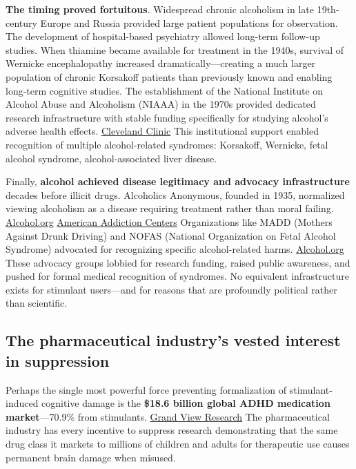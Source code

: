 \textbf{The timing proved fortuitous}. Widespread chronic alcoholism in late 19th-century Europe and Russia provided large patient populations for observation. The development of hospital-based psychiatry allowed long-term follow-up studies. When thiamine became available for treatment in the 1940s, survival of Wernicke encephalopathy increased dramatically---creating a much larger population of chronic Korsakoff patients than previously known and enabling long-term cognitive studies. The establishment of the National Institute on Alcohol Abuse and Alcoholism (NIAAA) in the 1970s provided dedicated research infrastructure with stable funding specifically for studying alcohol's adverse health effects. \href{https://my.clevelandclinic.org/health/diseases/22687-wernicke-korsakoff-syndrome}{Cleveland Clinic} This institutional support enabled recognition of multiple alcohol-related syndromes: Korsakoff, Wernicke, fetal alcohol syndrome, alcohol-associated liver disease.

Finally, \textbf{alcohol achieved disease legitimacy and advocacy infrastructure} decades before illicit drugs. Alcoholics Anonymous, founded in 1935, normalized viewing alcoholism as a disease requiring treatment rather than moral failing. \href{https://alcohol.org/advocacy-groups/}{Alcohol.org} \href{https://americanaddictioncenters.org/rehab-guide/substance-abuse-organizations}{American Addiction Centers} Organizations like MADD (Mothers Against Drunk Driving) and NOFAS (National Organization on Fetal Alcohol Syndrome) advocated for recognizing specific alcohol-related harms. \href{https://alcohol.org/advocacy-groups/}{Alcohol.org} These advocacy groups lobbied for research funding, raised public awareness, and pushed for formal medical recognition of syndromes. No equivalent infrastructure exists for stimulant users---and for reasons that are profoundly political rather than scientific.

\subsection{The pharmaceutical industry's vested interest in suppression}\label{16_missing_syndrome-the-pharmaceutical-industrys-vested-interest-in-suppression}

Perhaps the single most powerful force preventing formalization of stimulant-induced cognitive damage is the \textbf{\$18.6 billion global ADHD medication market}---70.9\% from stimulants. \href{https://www.grandviewresearch.com/industry-analysis/attention-deficit-hyperactivity-disorder-adhd-market}{Grand View Research} The pharmaceutical industry has every incentive to suppress research demonstrating that the same drug class it markets to millions of children and adults for therapeutic use causes permanent brain damage when misused.

